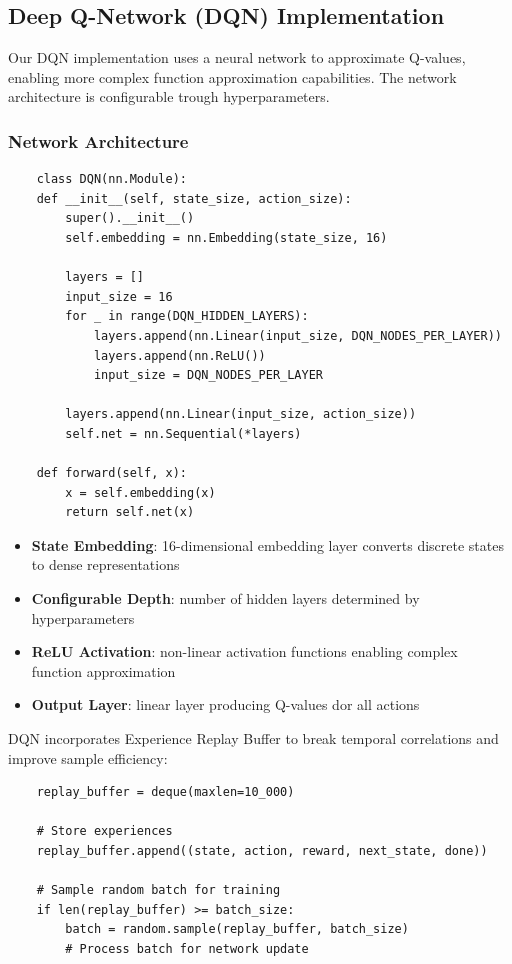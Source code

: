 \documentclass[a4paper,12pt]{article}
\begin{document}
\subsection{Deep Q-Network (DQN) Implementation}
Our DQN implementation uses a neural network to approximate Q-values, enabling more complex function approximation capabilities. The network architecture is configurable trough hyperparameters.
\subsubsection{Network Architecture}
\begin{lstlisting}
    class DQN(nn.Module):
    def __init__(self, state_size, action_size):
        super().__init__()
        self.embedding = nn.Embedding(state_size, 16)
        
        layers = []
        input_size = 16
        for _ in range(DQN_HIDDEN_LAYERS):
            layers.append(nn.Linear(input_size, DQN_NODES_PER_LAYER))
            layers.append(nn.ReLU())
            input_size = DQN_NODES_PER_LAYER
            
        layers.append(nn.Linear(input_size, action_size))
        self.net = nn.Sequential(*layers)
    
    def forward(self, x):
        x = self.embedding(x)
        return self.net(x)
\end{lstlisting}
\begin{itemize}
    \item \textbf{State Embedding}: 16-dimensional embedding layer converts discrete states to dense representations
    \item \textbf{Configurable Depth}: number of hidden layers determined by hyperparameters
    \item \textbf{ReLU Activation}: non-linear activation functions enabling complex function approximation
    \item \textbf{Output Layer}: linear layer producing Q-values dor all actions
\end{itemize}
DQN incorporates Experience Replay Buffer to break temporal correlations and improve sample efficiency:
\begin{lstlisting}
    replay_buffer = deque(maxlen=10_000)

    # Store experiences
    replay_buffer.append((state, action, reward, next_state, done))

    # Sample random batch for training
    if len(replay_buffer) >= batch_size:
        batch = random.sample(replay_buffer, batch_size)
        # Process batch for network update
\end{lstlisting}
\end{document}
